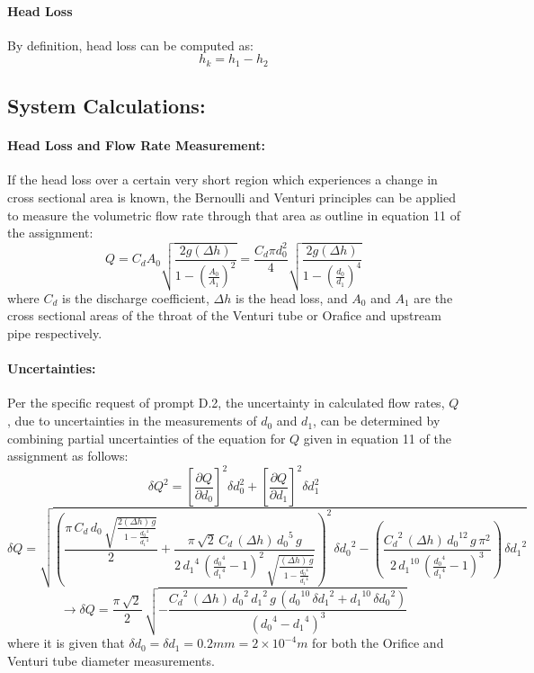 \documentclass[12pt]{article}
\begin{document}
	\paragraph{Head Loss}
	By definition, head loss can be computed as:
	\begin{equation}
 		h_k = h_1 - h_2
	\end{equation}
	
	\subsection{System Calculations:}
	\paragraph{Head Loss and Flow Rate Measurement:}
	If the head loss over a certain very short region which experiences a change in cross sectional area is known, the Bernoulli and Venturi principles can be applied to measure the volumetric flow rate through that area as outline in equation 11 of the assignment:
	\begin{equation}
		Q = C_dA_0\sqrt{\frac{2g(\Delta h)}{1-(\frac{A_0}{A_1})^2}} = \frac{C_d\pi d_0^2}{4}\sqrt{\frac{2g(\Delta h)}{1-(\frac{d_0}{d_1})^4}}
	\end{equation}
	where $C_d$ is the discharge coefficient, $\Delta h$ is the head loss, and $A_0$ and $A_1$ are the cross sectional areas of the throat of the Venturi tube or Orafice and upstream pipe respectively.
	\paragraph{Uncertainties:}
	Per the specific request of prompt D.2, the uncertainty in calculated flow rates, $Q$, due to uncertainties in the measurements of $d_0$ and $d_1$, can be determined by combining partial uncertainties of the equation for $Q$ given in equation 11 of the assignment as follows:
	$$\delta Q^2 = \left[\frac{\partial Q}{\partial d_0}\right]^2\delta d_0^2 + \left[\frac{\partial Q}{\partial d_1}\right]^2\delta d_1^2$$
	$$\delta Q = \sqrt{{\left(\frac{\pi \,C_{d}\,d_{0}\,\sqrt{\frac{2(\Delta h)\,g}{1-\frac{{d_{0}}^4}{{d_{1}}^4}}}}{2}+\frac{\pi \,\sqrt{2}\,C_{d}\,(\Delta h)\,{d_{0}}^5\,g}{2\,{d_{1}}^4\,{\left(\frac{{d_{0}}^4}{{d_{1}}^4}-1\right)}^2\,\sqrt{\frac{(\Delta h)\,g}{1-\frac{{d_{0}}^4}{{d_{1}}^4}}}}\right)}^2\,{\delta d_{0}}^2-\left(\frac{{C_{d}}^2\,(\Delta h)\,{d_{0}}^{12}\,g\,\pi ^2}{2\,{d_{1}}^{10}\,{\left(\frac{{d_{0}}^4}{{d_{1}}^4}-1\right)}^3}\right)\,{\delta d_{1}}^2}$$
	\begin{equation}
		\rightarrow \delta Q = \frac{\pi \,\sqrt{2}}{2}\,\sqrt{-\frac{{C_{d}}^2\,(\Delta h)\,{d_{0}}^2\,{d_{1}}^2\,g\,\left({d_{0}}^{10}\,{\delta d_{1}}^2+{d_{1}}^{10}\,{\delta d_{0}}^2\right)}{{\left({d_{0}}^4-{d_{1}}^4\right)}^3}}
	\end{equation}
	where it is given that $\delta d_0=\delta d_1=0.2mm=2\times10^{-4}m$ for both the Orifice and Venturi tube diameter measurements.
	
\end{document}
